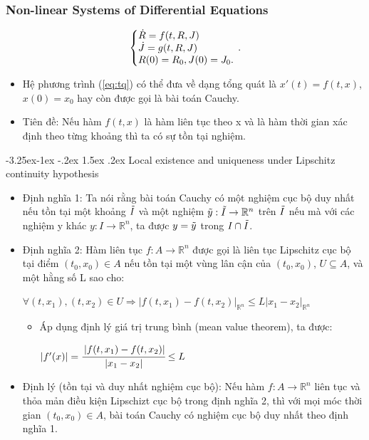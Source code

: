 \documentclass[a4paper]{article}
\makeatletter
\newcounter {subsubsubsection}[subsubsection]
\newcommand\subsubsubsection{\@startsection{subsubsubsection}{4}{\z@}%
                                     {-3.25ex\@plus -1ex \@minus -.2ex}%
                                     {1.5ex \@plus .2ex}%
                                     {\normalfont\normalsize\bfseries}}
\makeatother
\begin{document}
\subsubsection{Non-linear Systems of Differential Equations}
\begin{equation} \label{eq:tq}
    \left\{\begin{array}{@{}l@{}}
        \dot{R} = f(t,R, J )\\
        \dot{J} =  g(t,R, J)\\
        R(0) = R_{0}, J(0) = J_{0}.
    \end{array}\right.\,.\\
\end{equation}
\begin{itemize}
    \item Hệ phương trình (\ref{eq:tq}) có thể đưa về dạng tổng quát là $x'(t) = f(t, x)$, $x(0) = x_0$ hay còn được gọi là bài toán Cauchy.
    \item Tiên đề: Nếu hàm $f(t,x)$ là hàm liên tục theo x và là hàm thời gian xác định theo từng khoảng thì ta có sự tồn tại nghiệm.
\end{itemize}
\subsubsubsection{Local existence and uniqueness under Lipschitz continuity hypothesis}
\begin{itemize}
\item Định nghĩa 1: Ta nói rằng bài toán Cauchy có một nghiệm cục bộ duy nhất nếu tồn tại một khoảng $\Tilde{I}$ và một nghiệm $\Tilde{y} : \Tilde{I} \rightarrow \mathbb{R}^n$ trên $\Tilde{I}$ nếu mà với các nghiệm y khác $y:I \rightarrow \mathbb{R}^n$, ta được $y=\Tilde{y}$ trong $I\cap\Tilde{I}$.
\item Định nghĩa 2: Hàm liên tục $f:A\rightarrow\mathbb{R}^n$ được gọi là liên tục Lipschitz cục bộ tại điểm $(t_0,x_0)\in A$ nếu tồn tại một vùng lân cận của $(t_0,x_0)$, $U\subseteq A$, và một hằng số L sao cho:
    \begin{center}
        $\forall(t,x_1),(t,x_2) \in U\Longrightarrow \left|f(t,x_1) - f(t,x_2)\right|_{\mathbb{R}^n} \leq L \left|x_1 - x_2\right|_{\mathbb{R}^n}$   
    \end{center}
    \begin{itemize}
        \item[]Áp dụng định lý giá trị trung bình (mean value theorem), ta được:
        \begin{center}
            $\left|f'(x)\right|=\cfrac{\left|f(t,x_1) - f(t,x_2)\right|}{\left|x_1 - x_2\right|} \leq L $
        \end{center}
    \end{itemize}
\item Định lý (tồn tại và duy nhất nghiệm cục bộ): Nếu hàm $f:A\rightarrow \mathbb{R}^n $ liên tục và thỏa mản điều kiện Lipschizt cục bộ trong định nghĩa 2, thì với mọi móc thời gian $(t_0,x_0)\in A$, bài toán Cauchy có nghiệm cục bộ duy nhất theo định nghĩa 1.
\end{itemize}
\end{document}
